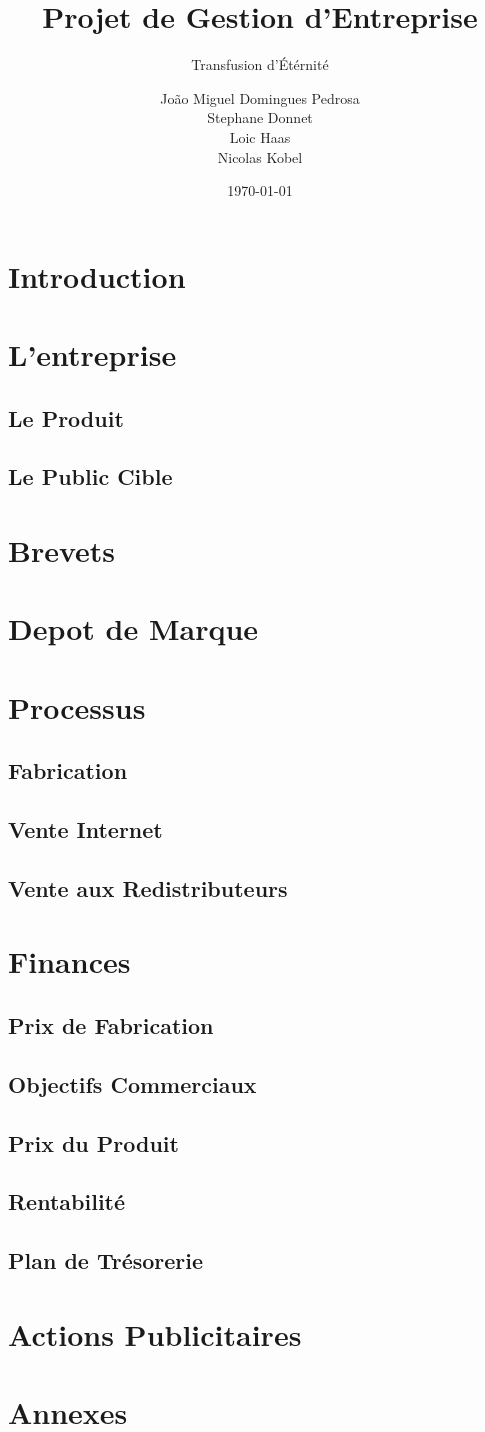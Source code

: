 \documentclass[10pt,a4paper]{article}
\title{Projet de Gestion d'Entreprise}
\subtitle{Transfusion d'Étérnité}
\author{João Miguel Domingues Pedrosa \\ Stephane Donnet \\ Loic Haas \\ Nicolas Kobel}
\date{\today}
\begin{document}
\maketitle
\tableofcontents
\newpage
\section{Introduction}
\section{L'entreprise}
\subsection{Le Produit}
\subsection{Le Public Cible}
\section{Brevets}
\section{Depot de Marque}
\section{Processus}
\subsection{Fabrication}
\subsection{Vente Internet}
\subsection{Vente aux Redistributeurs}
\section{Finances}
\subsection{Prix de Fabrication}
\subsection{Objectifs Commerciaux}
\subsection{Prix du Produit}
\subsection{Rentabilité}
\subsection{Plan de Trésorerie}
\section{Actions Publicitaires}
\section{Annexes}
\end{document}
